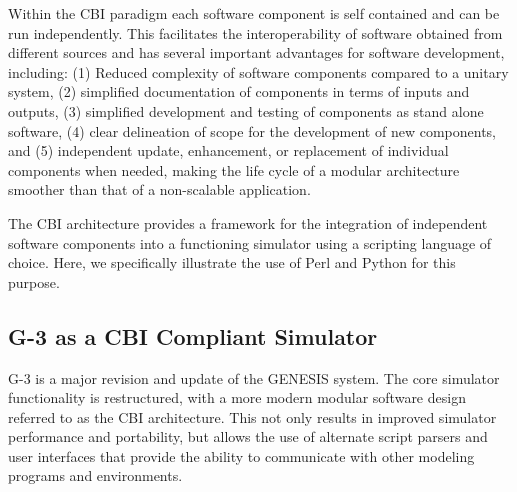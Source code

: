 \documentclass[10pt]{article}
\begin{document}
Within the CBI paradigm each software component is self contained and
can be run independently. This facilitates the interoperability of
software obtained from different sources and has several important
advantages for software development, including: (1) Reduced complexity
of software components compared to a unitary system, (2) simplified
documentation of components in terms of inputs and outputs, (3) simplified development and testing of components as stand
alone software, (4) clear delineation of scope for the development
of new components, and (5)
independent update, enhancement, or
replacement of individual components when needed, making the life cycle of a modular architecture
smoother than that of a non-scalable application.

The CBI architecture provides a framework for the
integration of independent software components into a functioning
simulator using a scripting language of choice.  Here, we specifically
illustrate the use of Perl and Python for this purpose.

\subsection*{G-3 as a CBI Compliant Simulator}

G-3 is a major revision and update of the GENESIS system.  The core
simulator functionality is restructured, with a more modern modular software
design referred to as the CBI architecture. This not
only results in improved simulator performance and portability, but
allows the use of alternate script parsers and user interfaces that provide the ability to communicate with other modeling programs and
environments.
\end{document}
